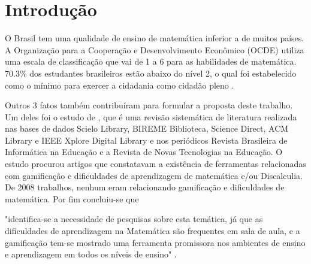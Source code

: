 \chapter[Introdução]{Introdução}

\begin{comment}
Tendo em vista que já é difícil para alunos aprenderem matemática, a dificuldade só aumenta quando fala-se de alunos com Transtorno do Déficit de Atenção com Hiperatividade (TDAH) inseridos no contexto de faculdade, onde a desatenção aumenta, já que professores não estão preparados e precisam renovar seus métodos para atrair atenção dos alunos para ensinar a matéria e ainda fazer disso algo divertido para fazer com que o foco seja maior ainda. Já que aprender brincando gera melhores resultados. Segundo (Russel A. Barkley, PhD. p. iv) quem possui TDAH têm mais dificuldades que pessoas normais em ambientes que exijam mais foco, objetividade e autocontrole. Também é dito que as características principais de TDAH podem trazer diversas dificuldades no contexto escolar (George J. DuPaul, PhD e Gary Stoner, PhD. p.4).

De acordo com (George J. DuPaul, PhD e Gary Stoner, PhD. p.4) o TDAH comparado a outros problemas como autismo e depressão é um transtorno de alta incidência e se mostra presente principalmente em meninos. Por isso o foco deste estudo também será em estudantes com TDAH.
\end{comment}

O Brasil tem uma qualidade de ensino de matemática inferior a de muitos países. A Organização para a Cooperação e Desenvolvimento Econômico (OCDE) utiliza uma escala de classificação que vai de 1 a 6 para as habilidades de matemática. 70.3\% dos estudantes brasileiros estão abaixo do nível 2, o qual foi estabelecido como o mínimo para exercer a cidadania como cidadão pleno \cite{inep2015nivelcidadania}. 

Outros 3 fatos também contribuíram para formular a proposta deste trabalho. Um deles foi o estudo de \cite{revbibmatgam}, que é uma revisão sistemática de literatura realizada nas bases de dados Scielo Library, BIREME Biblioteca, Science Direct, ACM Library e IEEE Xplore Digital Library e nos periódicos Revista Brasileira de Informática na Educação e a Revista de Novas Tecnologias na Educação. O estudo procurou artigos que constatavam a existência de ferramentas relacionadas com gamificação e dificuldades de aprendizagem de matemática e/ou Discalculia. De 2008 trabalhos, nenhum eram relacionando gamificação e dificuldades de matemática. Por fim concluiu-se que \begin{citacao}"identifica-se a necessidade de pesquisas sobre esta temática, já que as dificuldades de aprendizagem na Matemática são frequentes em sala de aula, e a gamificação tem-se mostrado uma ferramenta promissora nos ambientes de ensino e aprendizagem em todos os níveis de ensino" \cite{revbibmatgam}. \end{citacao} 

